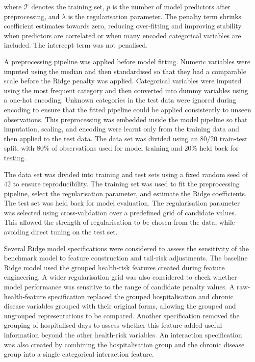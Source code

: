 	where \(\mathcal{T}\) denotes the training set, \(p\) is the number of model predictors after preprocessing, and \(\lambda\) is the regularisation parameter. The penalty term shrinks coefficient estimates towards zero, reducing over-fitting and improving stability when predictors are correlated or when many encoded categorical variables are included. The intercept term was not penalised.
	
	A preprocessing pipeline was applied before model fitting. Numeric variables were imputed using the median and then standardised so that they had a comparable scale before the Ridge penalty was applied. Categorical variables were imputed using the most frequent category and then converted into dummy variables using a one-hot encoding. Unknown categories in the test data were ignored during encoding to ensure that the fitted pipeline could be applied consistently to unseen observations. This preprocessing was embedded inside the model pipeline so that imputation, scaling, and encoding were learnt only from the training data and then applied to the test data. The data set was divided using an 80/20 train-test split, with 80\% of observations used for model training and 20\% held back for testing.
	
	The data set was divided into training and test sets using a fixed random seed of 42 to ensure reproducibility. The training set was used to fit the preprocessing pipeline, select the regularisation parameter, and estimate the Ridge coefficients. The test set was held back for model evaluation. The regularisation parameter was selected using cross-validation over a predefined grid of candidate values. This allowed the strength of regularisation to be chosen from the data, while avoiding direct tuning on the test set.
	
	Several Ridge model specifications were considered to assess the sensitivity of the benchmark model to feature construction and tail-risk adjustments. The baseline Ridge model used the grouped health-risk features created during feature engineering. A wider regularisation grid was also considered to check whether model performance was sensitive to the range of candidate penalty values. A raw-health-feature specification replaced the grouped hospitalisation and chronic disease variables grouped with their original forms, allowing the grouped and ungrouped representations to be compared. Another specification removed the grouping of hospitalised days to assess whether this feature added useful information beyond the other health-risk variables. An interaction specification was also created by combining the hospitalisation group and the chronic disease group into a single categorical interaction feature.
	
